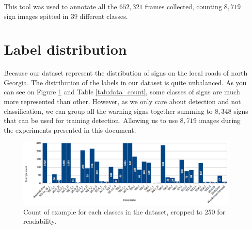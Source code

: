 \begin{appendices}
This tool was used to annotate all the $652,321$ frames collected, counting $8,719$ sign images spitted in $39$ different classes.

\section{Label distribution}
\paragraph{}
Because our dataset represent the distribution of signs on the local roads of north Georgia. The distribution of the labels in our dataset is quite unbalanced. As you can see on Figure \ref{fig:data_count} and Table \ref{tab:data_count}, some classes of signs are much more represented than other. However, as we only care about detection and not classification, we can group all the warning signs together summing to $8,348$ signs that can be used for training detection. Allowing us to use $8,719$ images during the experiments presented in this document.

\begin{figure}
    \centering
    \includegraphics[width=\linewidth]{figures/data_repartition.png}
    \caption{Count of example for each classes in the dataset, cropped to 250 for readability.}
    \label{fig:data_count}
\end{figure}{}


\end{appendices}
